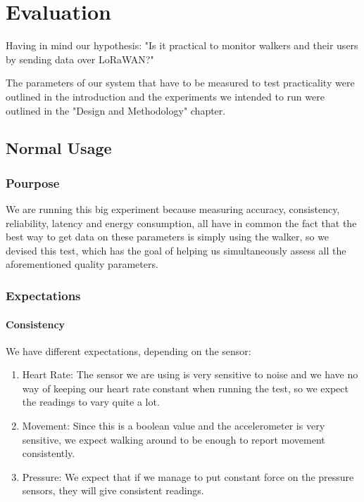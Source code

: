 \chapter{Evaluation}
\label{cha:evaluation}

Having in mind our hypothesis: "Is it practical to monitor walkers and their users by sending data over LoRaWAN?"

The parameters of our system that have to be measured to test practicality were outlined in the introduction and the experiments we intended to run were outlined in the "Design and Methodology" chapter.

\section{Normal Usage}

	\subsection*{Pourpose}
		We are running this big experiment because measuring accuracy, consistency, reliability, latency and energy consumption, all have in common the fact that the best way to get data on these parameters is simply using the walker, so we devised this test, which has the goal of helping us simultaneously assess all the aforementioned quality parameters.

	\subsection*{Expectations}
		\subsubsection*{Consistency}
			We have different expectations, depending on the sensor:

			\begin{enumerate}
				\item Heart Rate: The sensor we are using is very sensitive to noise and we have no way of keeping our heart rate constant when running the test, so we expect the readings to vary quite a lot.
				\item Movement: Since this is a boolean value and the accelerometer is very sensitive, we expect walking around to be enough to report movement consistently.
				\item Pressure: We expect that if we manage to put constant force on the pressure sensors, they will give consistent readings.
			\end{enumerate}

